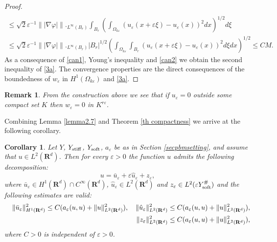 \documentclass[11pt]{article}
\newcommand\e {\varepsilon}
\newcommand\stiff{{\rm stiff}}
\newcommand\soft{{\rm soft}}
\def\RR{\R}
\newcommand{\R}{\mathbf{R}}
\newtheorem{corollary}[theorem]{Corollary}
\newtheorem{remark}[theorem]{Remark}
\theoremstyle{remark}
\begin{document}
\begin{appendices}
\begin{proof}
\begin{equation}
\begin{aligned}
			\\
			\leq \sqrt{2}\e^{-1} \| |\nabla\varphi| \|\big._{L^\infty(B_r)}
			\int_{B_r}  \left( \int_{\Omega_{k\e}} (u_\e(x+\e\xi) - u_\e(x))^2 dx \right)^{1/2} d\xi
			\\
			\leq \sqrt{2}\e^{-1} \| |\nabla\varphi| \|\big._{L^\infty(B_r)}
			|B_r|^{1/2}  \left( \int_{\Omega_{k\e}} \int_{B_r} (u_\e(x+\e\xi) - u_\e(x))^2 d\xi dx \right)^{1/2} \leq CM.
		\end{aligned}
	\end{equation}
	As a consequence of \eqref{can1}, Young's inequality and \eqref{can2} we obtain the second inequality of \eqref{3a}.
	The convergence properties are the direct consequences of the boundedness of $w_\e$ in $H^1(\Omega_{k\e})$ and \eqref{3a}.
\end{proof}
\begin{remark} \label{marin1}
	From the construction above we see that if $u_\e =0$ outside some compact set $K$ then $w_\e=0$ in $K^{r\e}$.
\end{remark} 	
Combining Lemma \ref{lemma2.7} and Theorem \ref{th compactness} we arrive at the following corollary.
\begin{corollary} \label{corcan3}
	Let $Y$, $Y_\stiff$, $Y_\soft $, $a_\e $ be as in Section \ref{secpbmsetting},
	and assume that $u \in L^2(\RR^d)$. Then for every $\varepsilon>0$ the function $u$ admits the following decomposition:
	$$
	u=\bar{u}_\e  +\varepsilon \hat{u}_\e +z_\e , $$
	where
	$\bar{u}_\e  \in H^1(\RR^d)\cap C^\infty(\R^d)$, $\hat{u}_\e  \in L^2(\RR^d)$ and $z_\e \in L^2(\e Y_\soft^\#)$ and the following estimates are valid:
	\begin{eqnarray*}
		& & \|\bar{u}_\e \|^2_{H^1(\RR^d)} \leq C(a_\e (u,u)+\|u\|^2_{L^2(\RR^d)}), \quad  \|\hat{u}_\e \|^2_{L^2(\RR^d)} \leq C(a_\e (u,u)+\|u\|^2_{L^2(\RR^d)}), \\ & & \hspace{+5ex}  \|z_\e \|^2_{L^2(\RR^d)} \leq C(a_\e (u,u)+\|u\|^2_{L^2(\RR^d)}),
	\end{eqnarray*}
	where $C>0$ is independent of $\varepsilon>0$.
	

\end{corollary}
\end{appendices}
\end{document}
